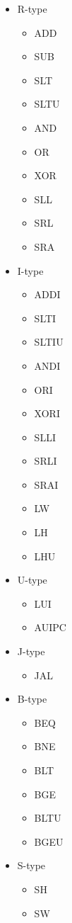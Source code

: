 \documentclass{jlreq}
\begin{document}
\begin{itemize}
	\item R-type
	\begin{itemize}
		\item ADD
		\item SUB
		\item SLT
		\item SLTU
		\item AND
		\item OR
		\item XOR
		\item SLL
		\item SRL
		\item SRA
	\end{itemize}

	\item I-type
	\begin{itemize}
		\item ADDI
		\item SLTI
		\item SLTIU
		\item ANDI
		\item ORI
		\item XORI
		\item SLLI
		\item SRLI
		\item SRAI
		\item LW
		\item LH
		\item LHU
	\end{itemize}
	\item U-type
	\begin{itemize}
		\item LUI
		\item AUIPC
	\end{itemize}
	\item J-type
		\begin{itemize}
			\item JAL
		\end{itemize}
	\item B-type
	\begin{itemize}
		\item BEQ
		\item BNE
		\item BLT
		\item BGE
		\item BLTU
		\item BGEU
	\end{itemize}
	\item S-type
	\begin{itemize}
		\item SH
		\item SW
	\end{itemize}
\end{itemize}
\end{document}
